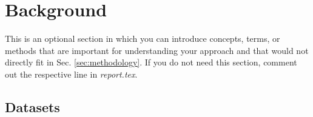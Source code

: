 \documentclass[../report.tex]{subfiles}
\begin{document}
    \section{Background}
    \label{sec:background}

    This is an optional section in which you can introduce concepts, terms, or methods that are important for understanding your approach and that would not directly fit in Sec. \ref{sec:methodology}.
    If you do not need this section, comment out the respective line in \emph{report.tex}.

    \subsection{Datasets}
    \label{subsec:datasets}
\end{document}

